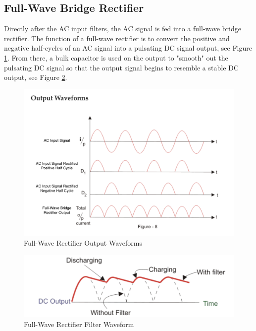 \documentclass[conference]{IEEEtran}
\begin{document}
\subsection{Full-Wave Bridge Rectifier}
Directly after the AC input filters, the AC signal is fed into a full-wave bridge rectifier. The function of a full-wave rectifier is to convert the positive and negative half-cycles of an AC signal into a pulsating DC signal output, see Figure \ref{fig:full-wave_rectifier_output_waveform_diagram}. From there, a bulk capacitor is used on the output to "smooth" out the pulsating DC signal so that the output signal begins to resemble a stable DC output, see Figure \ref{fig:full-wave_bridge_rectifier_filter_waveform_diagram}. 

\begin{figure}[htp]
    \centering
    \includegraphics[width=1.0\linewidth]{full-wave_bridge_rectifier_output_waveform.png}
    \caption{Full-Wave Rectifier Output Waveforms}
    \label{fig:full-wave_rectifier_output_waveform_diagram}
\end{figure}

\begin{figure}[h]
    \centering
    \includegraphics[width=1.0\linewidth]{full-wave_bridge_rectifier_filter_waveform.png}
    \caption{Full-Wave Rectifier Filter Waveform}
    \label{fig:full-wave_bridge_rectifier_filter_waveform_diagram}
\end{figure}
\end{document}
